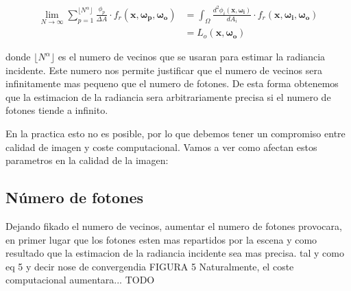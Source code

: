 \documentclass{article}
\begin{document}
\begin{equation}
\begin{split}
\lim_{N\to\infty} \sum_{p=1}^{\lfloor N^{\alpha}\rfloor} \frac{\phi_{p}}{\Delta A} \cdot f_r(\mathbf{x}, \mathbf{\omega_{p}}, \mathbf{\omega_{o}}) &= \int_{\Omega} \frac{d^{2}\phi_{i}(\mathbf{x}, \mathbf{\omega_{i}})}{dA_{i}} \cdot f_r(\mathbf{x}, \mathbf{\omega_{i}}, \mathbf{\omega_{o}}) \\
  &= L_o(\mathbf{x}, \mathbf{\omega_{o}})
\end{split}
\end{equation}

donde \(\lfloor N^{\alpha} \rfloor\) es el numero de vecinos que se usaran para estimar la radiancia incidente. Este numero nos permite justificar que el numero de vecinos sera infinitamente mas pequeno que el numero de fotones.
De esta forma obtenemos que la estimacion de la radiancia sera arbitrariamente precisa si el numero de fotones tiende a infinito.

En la practica esto no es posible, por lo que debemos tener un compromiso entre calidad de imagen y coste computacional. Vamos a ver como afectan estos parametros en la calidad de la imagen:

\subsection{Número de fotones}
Dejando fikado el numero de vecinos, aumentar el numero de fotones provocara,
en primer lugar que los fotones esten mas repartidos por la escena y como resultado
que la estimacion de la radiancia incidente sea mas precisa. tal y como eq 5 y decir nose de convergendia
FIGURA 5
Naturalmente, el coste computacional aumentara...
TODO
\end{document}
